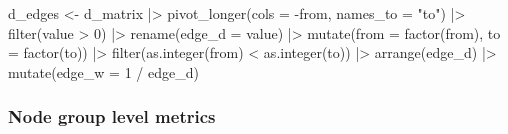 \documentclass[
  letterpaper,
  DIV=11,
  numbers=noendperiod]{scrartcl}
\newenvironment{Shaded}{\begin{snugshade}}{\end{snugshade}}
\newcommand{\AttributeTok}[1]{\textcolor[rgb]{0.40,0.45,0.13}{#1}}
\newcommand{\DecValTok}[1]{\textcolor[rgb]{0.68,0.00,0.00}{#1}}
\newcommand{\FunctionTok}[1]{\textcolor[rgb]{0.28,0.35,0.67}{#1}}
\newcommand{\NormalTok}[1]{\textcolor[rgb]{0.00,0.23,0.31}{#1}}
\newcommand{\OtherTok}[1]{\textcolor[rgb]{0.00,0.23,0.31}{#1}}
\newcommand{\SpecialCharTok}[1]{\textcolor[rgb]{0.37,0.37,0.37}{#1}}
\newcommand{\StringTok}[1]{\textcolor[rgb]{0.13,0.47,0.30}{#1}}
\begin{document}
\begin{Shaded}
\begin{Highlighting}[]
\NormalTok{d\_edges }\OtherTok{\textless{}{-}}\NormalTok{ d\_matrix }\SpecialCharTok{|\textgreater{}} 
    \FunctionTok{pivot\_longer}\NormalTok{(}\AttributeTok{cols =} \SpecialCharTok{{-}}\NormalTok{from,}
                 \AttributeTok{names\_to =} \StringTok{"to"}\NormalTok{) }\SpecialCharTok{|\textgreater{}} 
  \FunctionTok{filter}\NormalTok{(value }\SpecialCharTok{\textgreater{}} \DecValTok{0}\NormalTok{) }\SpecialCharTok{|\textgreater{}} 
  \FunctionTok{rename}\NormalTok{(}\AttributeTok{edge\_d =}\NormalTok{ value) }\SpecialCharTok{|\textgreater{}} 
    \FunctionTok{mutate}\NormalTok{(}\AttributeTok{from =} \FunctionTok{factor}\NormalTok{(from), }\AttributeTok{to =} \FunctionTok{factor}\NormalTok{(to)) }\SpecialCharTok{|\textgreater{}} 
    \FunctionTok{filter}\NormalTok{(}\FunctionTok{as.integer}\NormalTok{(from) }\SpecialCharTok{\textless{}} \FunctionTok{as.integer}\NormalTok{(to)) }\SpecialCharTok{|\textgreater{}} 
    \FunctionTok{arrange}\NormalTok{(edge\_d) }\SpecialCharTok{|\textgreater{}} 
    \FunctionTok{mutate}\NormalTok{(}\AttributeTok{edge\_w =} \DecValTok{1} \SpecialCharTok{/}\NormalTok{ edge\_d)}
\end{Highlighting}
\end{Shaded}

\subsubsection{Node group level metrics}\label{node-group-level-metrics}
\end{document}
